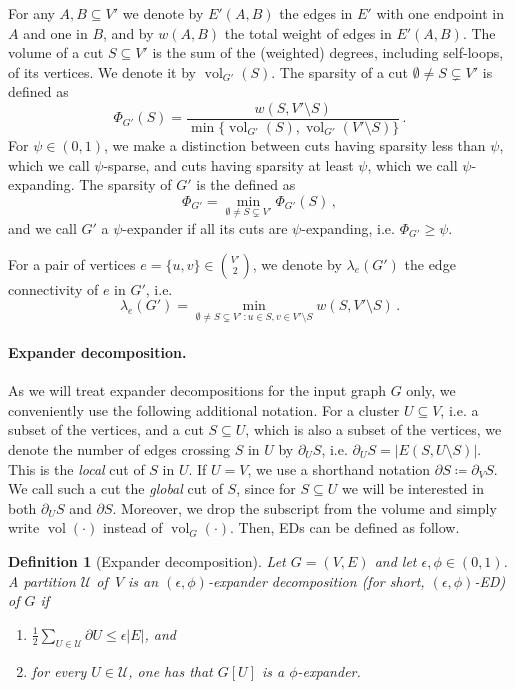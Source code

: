 \documentclass[epsfig,letter,11pt]{article}
\numberwithin{equation}{section}
\DeclareMathOperator{\vol}{vol}
\newcommand{\uncut}[2]{{\partial}_{#2} #1}
\newcommand{\uncutg}[1]{{\partial} #1}
\newtheorem{definition}[theorem]{Definition}
\begin{document}
For any $A,B \subseteq V'$ we denote by $E'(A,B)$ the edges in $E'$ with one endpoint in $A$ and one in $B$, and by $w(A,B)$ the total weight of edges in $E'(A,B)$. The volume of a cut $S \subseteq V'$ is the sum of the (weighted) degrees, including self-loops, of its vertices. We denote it by $\vol_{G'}(S)$. The sparsity of a cut $\emptyset \neq S \subsetneq V'$ is defined as
\begin{equation*}
	\Phi_{G'}(S) = \frac{w(S,V' \setminus S)}{\min\{\vol_{G'}(S), \vol_{G'}(V' \setminus S)\}} \, .
\end{equation*}
For $\psi \in (0,1)$, we make a distinction between cuts having sparsity less than $\psi$, which we call $\psi$-sparse, and cuts having sparsity at least $\psi$, which we call $\psi$-expanding. The sparsity of $G'$ is the defined as
\begin{equation*}
	\Phi_{G'} = \min_{\emptyset \neq S \subsetneq V'} \Phi_{G'}(S) \, ,
\end{equation*}
and we call $G'$ a $\psi$-expander if all its cuts are $\psi$-expanding, i.e. $\Phi_{G'} \ge \psi$.

For a pair of vertices $e=\{u,v\} \in \binom{V'}{2}$, we denote by $\lambda_{e}(G')$ the edge connectivity of $e$ in $G'$, i.e.
\begin{equation*}
	\lambda_{e}(G') = \min_{\emptyset \neq S \subsetneq V'\, : u \in S, v \in V' \setminus S} w(S,V'\setminus S) \, .
\end{equation*}

\paragraph{Expander decomposition.} As we will treat expander decompositions for the input graph $G$ only, we conveniently use the following additional notation. For a cluster $U \subseteq V$, i.e. a subset of the vertices, and a cut $S \subseteq U$, which is also a subset of the vertices, we denote the number of edges crossing $S$ in $U$ by $\uncut{S}{U}$, i.e. $\uncut{S}{U}=|E(S,U \setminus S)|$. This is the \emph{local} cut of $S$ in $U$. If $U = V$, we use a shorthand notation $\uncutg{S} \coloneqq \uncut{S}{V}$. We call such a cut the \emph{global} cut of $S$, since for $S \subseteq U$ we will be interested in both $\uncut{S}{U}$ and $\uncutg{S}$. Moreover, we drop the subscript from the volume and simply write $\vol(\cdot)$ instead of $\vol_G(\cdot)$. Then, EDs can be defined as follow.

\begin{definition}[Expander decomposition]
	\label{def:expdecclassic}
	Let $G=(V,E)$ and let $\epsilon, \phi \in (0,1)$. A partition $\mathcal{U}$ of~$V$ is an $(\epsilon, \phi)$-expander decomposition (for short, $(\epsilon, \phi)$-ED) of $G$ if
	\begin{enumerate}
		\item \label{property:crossingclassic} $\frac{1}{2}\sum_{U \in \mathcal{U}} \uncutg{U} \le \epsilon |E|$, and
		\item \label{property:expanderclassic} for every $U \in \mathcal{U}$, one has that $G[U]$ is a $\phi$-expander.
	\end{enumerate}
\end{definition}
\end{document}

